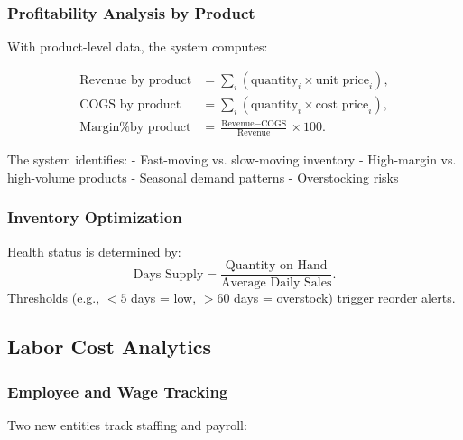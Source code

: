 \documentclass[10pt,a4paper]{article}
\begin{document}
\subsubsection{Profitability Analysis by Product}

With product-level data, the system computes:

\begin{align*}
\text{Revenue by product} &= \sum_i (\text{quantity}_i \times \text{unit price}_i),\\
\text{COGS by product} &= \sum_i (\text{quantity}_i \times \text{cost price}_i),\\
\text{Margin\% by product} &= \frac{\text{Revenue} - \text{COGS}}{\text{Revenue}} \times 100.
\end{align*}

The system identifies:
- Fast-moving vs. slow-moving inventory
- High-margin vs. high-volume products
- Seasonal demand patterns
- Overstocking risks

\subsubsection{Inventory Optimization}

Health status is determined by:
\[
\text{Days Supply} = \frac{\text{Quantity on Hand}}{\text{Average Daily Sales}}.
\]
Thresholds (e.g., $<5$ days = low, $>60$ days = overstock) trigger reorder alerts.

\subsection{Labor Cost Analytics}

\subsubsection{Employee and Wage Tracking}

Two new entities track staffing and payroll:
\end{document}
